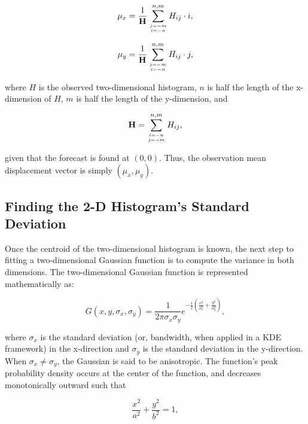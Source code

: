     \begin{equation}
        \label{mux}
        \mu_x = \frac{1}{\mathbf{H}} \sum\limits_{j=-m \atop i=-n}^{n,m}H_{ij} \cdot i,
    \end{equation}

    \begin{equation}
        \label{muy}
        \mu_y = \frac{1}{\mathbf{H}} \sum\limits_{j=-m \atop i=-n}^{n,m}H_{ij} \cdot j,
    \end{equation}

\noindent where $H$ is the observed two-dimensional histogram, $n$ is half the length of the x-dimension of $H$, $m$ is half the length of the y-dimension, and

    \begin{equation}
        \mathbf{H} = \sum\limits_{i=-n \atop j=-m}^{n,m} H_{ij},
    \end{equation}

\noindent given that the forecast is found at $(0, 0)$. Thus, the observation mean displacement vector is simply $(\mu_x, \mu_y)$.




\subsection{Finding the 2-D Histogram's Standard Deviation}
\label{std}

Once the centroid of the two-dimensional histogram is known, the next step to fitting a two-dimensional Gaussian function is to compute the variance in both dimensions. The two-dimensional Gaussian function is represented mathematically as:

    \begin{equation}
        \label{2DGauss}
        G(x, y, \sigma_x, \sigma_y) = \frac{1}{2 \pi \sigma_x \sigma_y} e^{- \frac{1}{2} \left( \frac{x^2}{\sigma_x^2} + \frac{y^2}{\sigma_y^2} \right)},
    \end{equation}

\noindent where $\sigma_x$ is the standard deviation (or, bandwidth, when applied in a KDE framework) in the x-direction and $\sigma_y$ is the standard deviation in the y-direction. When $\sigma_x \neq \sigma_y$, the Gaussian is said to be anisotropic. The function's peak probability density occurs at the center of the function, and decreases monotonically outward such that

    \begin{equation}
        \label{ellipse}
        \frac{x^2}{a^2} + \frac{y^2}{b^2} = 1,
    \end{equation}

